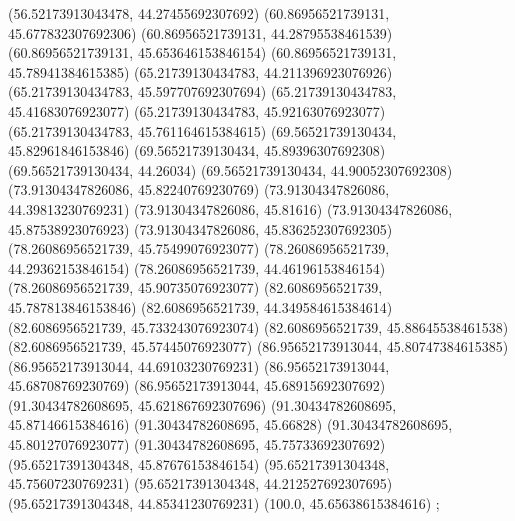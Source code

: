 {{{		(56.52173913043478, 44.27455692307692)
		(60.86956521739131, 45.677832307692306)
		(60.86956521739131, 44.28795538461539)
		(60.86956521739131, 45.653646153846154)
		(60.86956521739131, 45.78941384615385)
		(65.21739130434783, 44.211396923076926)
		(65.21739130434783, 45.597707692307694)
		(65.21739130434783, 45.41683076923077)
		(65.21739130434783, 45.92163076923077)
		(65.21739130434783, 45.761164615384615)
		(69.56521739130434, 45.82961846153846)
		(69.56521739130434, 45.89396307692308)
		(69.56521739130434, 44.26034)
		(69.56521739130434, 44.90052307692308)
		(73.91304347826086, 45.82240769230769)
		(73.91304347826086, 44.39813230769231)
		(73.91304347826086, 45.81616)
		(73.91304347826086, 45.87538923076923)
		(73.91304347826086, 45.836252307692305)
		(78.26086956521739, 45.75499076923077)
		(78.26086956521739, 44.29362153846154)
		(78.26086956521739, 44.46196153846154)
		(78.26086956521739, 45.90735076923077)
		(82.6086956521739, 45.787813846153846)
		(82.6086956521739, 44.349584615384614)
		(82.6086956521739, 45.733243076923074)
		(82.6086956521739, 45.88645538461538)
		(82.6086956521739, 45.57445076923077)
		(86.95652173913044, 45.80747384615385)
		(86.95652173913044, 44.69103230769231)
		(86.95652173913044, 45.68708769230769)
		(86.95652173913044, 45.68915692307692)
		(91.30434782608695, 45.621867692307696)
		(91.30434782608695, 45.87146615384616)
		(91.30434782608695, 45.66828)
		(91.30434782608695, 45.80127076923077)
		(91.30434782608695, 45.75733692307692)
		(95.65217391304348, 45.87676153846154)
		(95.65217391304348, 45.75607230769231)
		(95.65217391304348, 44.212527692307695)
		(95.65217391304348, 44.85341230769231)
		(100.0, 45.65638615384616)
	};

}}
